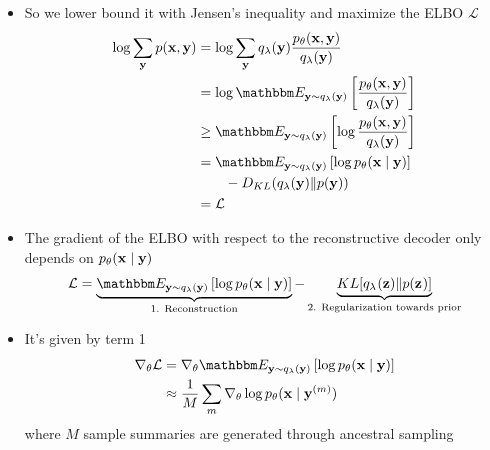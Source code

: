 \begin{frame}
\begin{center}
\end{center}
\begin{itemize}
\item So we lower bound it with Jensen's inequality and maximize the ELBO $\mathcal{L}$
\begin{align}
\log\sum_\by p(\bx, \by) &= \log\sum_\by q_\lambda(\by) \frac{p_\theta(\bx, \by)}{q_\lambda(\by)}\\
&= \log \E{\by\sim q_\lambda(\by)}{\frac{p_\theta(\bx, \by)}{q_\lambda(\by)}}\\
&\geq \E{\by\sim q_\lambda(\by)}{\log\frac{p_\theta(\bx, \by)}{q_\lambda(\by)}}\\
&= \E{\by\sim q_\lambda(\by)}{\log p_\theta(\bx\mid\by)} \\
&\qquad - D_{KL}(q_\lambda(\by) \Vert p(\by))\nonumber\\
&= \mathcal{L} \nonumber
\end{align}
\end{itemize}
\end{frame}

\begin{frame}
\begin{center}
\end{center}
\begin{itemize}
\item The gradient of the ELBO with respect to the reconstructive decoder only
depends on $p_\theta(\mathbf{x}\mid\mathbf{y})$
\begin{equation*}
\mathcal{L} = \underbrace{
        \E{\by\sim q_\lambda(\by)}{\log  p_\theta(\bx \mid \by)}
}_{\text{1. Reconstruction}} - \underbrace{
        KL[q_{\lambda^{}}(\zvec) \Vert p(\zvec^{})]
}_{\text{2. Regularization towards prior}}
\end{equation*}
\item It's given by term 1
\begin{align}
\nabla_\theta \mathcal{L} &=
\nabla_\theta \E{\by\sim q_\lambda(\by)}{\log  p_\theta(\bx \mid \by)}\\
&\approx \frac{1}{M}\sum_m \nabla_\theta\log p_\theta(\bx\mid\by^{(m)})
\end{align}
where $M$ sample summaries are generated through ancestral sampling
\end{itemize}
\end{frame}

